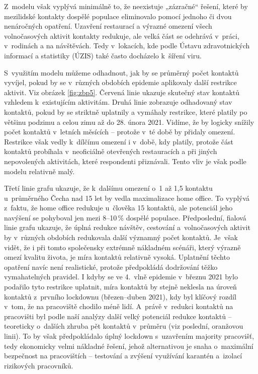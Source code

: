 Z modelu však vyplývá minimálně to, že neexistuje „zázračné“ řešení, které by mezilidské kontakty dospělé populace eliminovalo pomocí jednoho či dvou ne\-ná\-roč\-ných opatření. Uzavření restaurací a výrazné omezení všech volnočasových aktivit kontakty redukuje, ale velká část se odehrává v práci, v rodinách a na návštěvách. Tedy v lokacích, kde podle Ústavu zdravotnických informací a statistiky (ÚZIS) také často docházelo k šíření viru.

S využitím modelu můžeme odhadnout, jak by se průměrný počet kontaktů vyvíjel, pokud by se v různých obdobích epidemie aplikovaly další restrikce aktivit. Viz obrázek \ref{fig:zbp5}. Červená linie ukazuje skutečný stav kontaktů vzhledem k existujícím aktivitám. Druhá linie zobrazuje odhadovaný stav kontaktů, pokud by se striktně uplatnily a vymáhaly restrikce, které platily po většinu podzimu a celou zimu až do 28. února 2021. Vidíme, že by logicky snížily počet kontaktů v letních měsících – protože v té době by přidaly omezení. Restrikce však vedly k dílčímu omezení i v době, kdy platily, protože část kontaktů probíhala v neoficiálně otevřených restauracích a při jiných nepovolených aktivitách, které respondenti přiznávali. Tento vliv je však podle modelu relativně malý. 

Třetí linie grafu ukazuje, že k dalšímu omezení o~1 až 1,5 kontaktu u~průměrného Čecha nad 15 let by vedla maximalizace home office. To vyplývá z faktu, že home office redukuje u člověka 15 kontaktů, ale potenciál jeho navýšení se pohyboval jen mezi 8--10\,\% dospělé populace. Předposlední, fialová linie grafu ukazuje, že úplná redukce návštěv, cestování a volnočasových aktivit by v různých obdobích redukovala další významný počet kontaktů. Je však vidět, že i při tomto společensky extrémně nákladném scénáři, který výrazně omezí kvalitu života, je míra kontaktů relativně vysoká. Uplatnění těchto opatření navíc není realistické, protože předpokládá dodržování těžko vymahatelných pravidel. I kdyby se ve 4. vlně epidemie v březnu 2021 bylo podařilo tyto restrikce uplatnit, míra kontaktů by stejně neklesla na úroveň kontaktů z prvního lockdownu (březen--duben 2021), kdy byl klíčový rozdíl v tom, že na pracoviště chodilo méně lidí. A~právě v redukci kontaktů na pracovišti byl podle naší analýzy další velký potenciál redukce kontaktů – teoreticky o~dalších zhruba pět kontaktů v průměru (viz poslední, oranžovou linii). To by však předpokládalo úplný lockdown s uzavřením majority pracovišť, tedy ekonomicky velmi nákladné řešení, jehož alternativou je snaha o maximální bezpečnost na pracovištích – testování a zvýšení využívání karantén a~izolací rizikových pracovníků.

